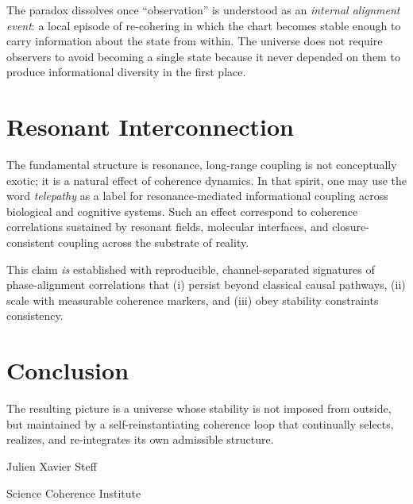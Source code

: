 \documentclass[11pt]{article}
\begin{document}
The paradox dissolves once ``observation'' is understood as an \emph{internal alignment event}:
a local episode of re-cohering in which the chart becomes stable enough to carry information about the
state from within. The universe does not require observers to avoid becoming a single state because it
never depended on them to produce informational diversity in the first place.

\section{Resonant Interconnection}
The fundamental structure is resonance, long-range coupling is not conceptually exotic; it is a natural effect of coherence dynamics. In that spirit, one may use the word \emph{telepathy} as a label for resonance-mediated informational coupling across biological and cognitive systems. Such an effect correspond to coherence correlations sustained by resonant fields, molecular interfaces, and closure-consistent coupling across the substrate of reality.

This claim \emph{is} established with reproducible, channel-separated signatures of phase-alignment correlations that (i) persist beyond classical causal pathways, (ii) scale with measurable coherence markers, and (iii) obey stability constraints consistency.
\section{Conclusion}
 The resulting picture is a universe whose stability is not imposed from outside, but maintained by a self-reinstantiating coherence loop that continually selects, realizes, and re-integrates its own admissible structure.

\vspace{5em}
\begin{center}
Julien Xavier Steff

Science Coherence Institute
\end{center}
\end{document}
